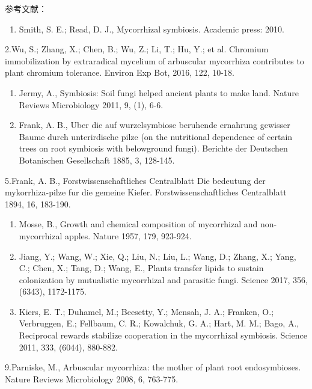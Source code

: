 \documentclass[]{book}
\providecommand{\tightlist}{%
  \setlength{\itemsep}{0pt}\setlength{\parskip}{0pt}}
\begin{document}
参考文献：

\begin{enumerate}
\def\labelenumi{\arabic{enumi}.}
\tightlist
\item
  Smith, S. E.; Read, D. J., Mycorrhizal symbiosis. Academic press:
  2010.
\end{enumerate}

2.Wu, S.; Zhang, X.; Chen, B.; Wu, Z.; Li, T.; Hu, Y.; et al. Chromium
immobilization by extraradical mycelium of arbuscular mycorrhiza
contributes to plant chromium tolerance. Environ Exp Bot, 2016, 122,
10-18.

\begin{enumerate}
\def\labelenumi{\arabic{enumi}.}
\setcounter{enumi}{2}
\item
  Jermy, A., Symbiosis: Soil fungi helped ancient plants to make land.
  Nature Reviews Microbiology 2011, 9, (1), 6-6.
\item
  Frank, A. B., Uber die auf wurzelsymbiose beruhende ernahrung gewisser
  Baume durch unterirdische pilze (on the nutritional dependence of
  certain trees on root symbiosis with belowground fungi). Berichte der
  Deutschen Botanischen Gesellschaft 1885, 3, 128-145.
\end{enumerate}

5.Frank, A. B., Forstwissenschaftliches Centralblatt Die bedeutung der
mykorrhiza-pilze fur die gemeine Kiefer. Forstwissenschaftliches
Centralblatt 1894, 16, 183-190.

\begin{enumerate}
\def\labelenumi{\arabic{enumi}.}
\setcounter{enumi}{5}
\item
  Mosse, B., Growth and chemical composition of mycorrhizal and
  non-mycorrhizal apples. Nature 1957, 179, 923-924.
\item
  Jiang, Y.; Wang, W.; Xie, Q.; Liu, N.; Liu, L.; Wang, D.; Zhang, X.;
  Yang, C.; Chen, X.; Tang, D.; Wang, E., Plants transfer lipids to
  sustain colonization by mutualistic mycorrhizal and parasitic fungi.
  Science 2017, 356, (6343), 1172-1175.
\item
  Kiers, E. T.; Duhamel, M.; Beesetty, Y.; Mensah, J. A.; Franken, O.;
  Verbruggen, E.; Fellbaum, C. R.; Kowalchuk, G. A.; Hart, M. M.; Bago,
  A., Reciprocal rewards stabilize cooperation in the mycorrhizal
  symbiosis. Science 2011, 333, (6044), 880-882.
\end{enumerate}

9.Parniske, M., Arbuscular mycorrhiza: the mother of plant root
endosymbioses. Nature Reviews Microbiology 2008, 6, 763-775.
\end{document}
